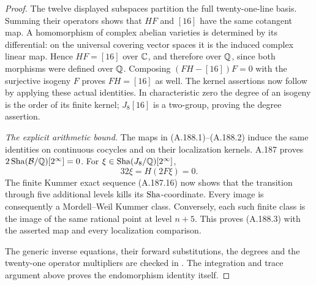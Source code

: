 \begin{proof}
The twelve displayed subspaces partition the full
twenty-one-line basis.  Summing their operators shows
that \(HF\) and \([16]\) have the same cotangent
map.  A homomorphism of complex abelian varieties is
determined by its differential: on the universal
covering vector spaces it is the induced complex
linear map.  Hence \(HF=[16]\) over \(\mathbb C\),
and therefore over \(\mathbb Q\), since both morphisms
were defined over \(\mathbb Q\).  Composing
\((FH-[16])F=0\) with the surjective isogeny \(F\)
proves \(FH=[16]\) as well.  The kernel assertions
now follow by applying these actual identities.  In
characteristic zero the degree of an isogeny is the
order of its finite kernel; \(J_8[16]\) is a
two-group, proving the degree assertion.

\emph{The explicit arithmetic bound.}
The maps in (A.188.1)--(A.188.2) induce the same
identities on continuous cocycles and on their
localization kernels.  A.187 proves
\(2\operatorname{Sha}(\mathcal B/\mathbb Q)[2^\infty]=0\).
For \(\xi\in\operatorname{Sha}(J_8/\mathbb Q)[2^\infty]\),
\[
                       32\xi=H(2F\xi)=0.
\]
The finite Kummer exact sequence (A.187.16) now
shows that the transition through five additional
levels kills its \(\operatorname{Sha}\)-coordinate.  Every image
is consequently a Mordell--Weil Kummer class.
Conversely, each such finite class is the image
of the same rational point at level \(n+5\).
This proves (A.188.3) with the asserted map and
every localization comparison.

The generic inverse equations, their forward
substitutions, the degrees and the twenty-one
operator multipliers are checked in
.
The integration and trace argument above proves
the endomorphism identity itself.
\end{proof}
